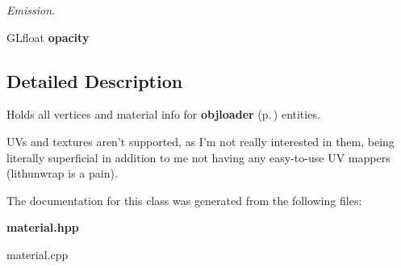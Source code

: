 \begin{CompactItemize}
\begin{CompactList}\small\item\em Emission.\item\end{CompactList}\item 
{}
GLfloat {\bf opacity}\label{classmaterial_m7}

\end{CompactItemize}


\subsection{Detailed Description}
Holds all vertices and material info for {\bf objloader} {\rm (p.\,\pageref{classobjloader})} entities.

UVs and textures aren't supported, as I'm not really interested in them, being literally superficial in addition to me not having any easy-to-use UV mappers (lithunwrap is a pain). 



The documentation for this class was generated from the following files:\begin{CompactItemize}
\item 
{\bf material.hpp}\item 
material.cpp\end{CompactItemize}
